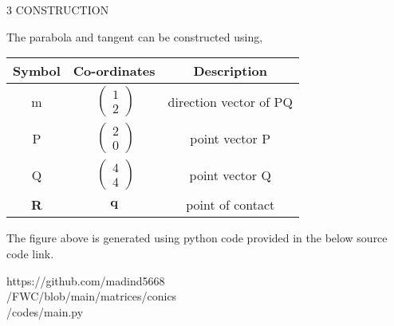\documentclass[a4paper,10pt]{report}
\let\vec\mathbf
\begin{document}
\begin{multicols}{2}
\vspace{2mm}\\
\vspace{2mm}\\
\centering \large\textsc{3  C}\footnotesize\textsc{ONSTRUCTION}\vspace{5mm}\\
\raggedright\large{The parabola and tangent can be constructed using,} 
\begin{center}
    \label{tab:truthtable}
    \setlength{\arrayrulewidth}{0.2mm}
\setlength{\tabcolsep}{5pt}
\renewcommand{\arraystretch}{1.25}
    \begin{tabular}{|c|c|c|}
    \hline %
      \large\textbf{Symbol} & \large\textbf{Co-ordinates} & \large\textbf{Description}\\
      \hline
	\large m & $\ \begin{pmatrix} 1\\2 \end{pmatrix}$ & \large direction vector of PQ\\
       \large P & $\ \begin{pmatrix} 2\\0 \end{pmatrix}$ & \large point vector P\\
	\large Q & $\ \begin{pmatrix} 4\\4 \end{pmatrix}$ & \large point vector Q\\
	\large \textbf{R} & $\vec{q}$ & point of contact\\
      \hline
   \end{tabular}
 \end{center}\vspace{5mm}
\raggedright\large{The figure above is generated using python code provided in the below source code link.}\vspace{2mm}\\
\begin{mdframed}
\raggedright\large{https://github.com/madind5668 \\ /FWC/blob/main/matrices/conics \\ /codes/main.py}
\end{mdframed}
\end{multicols}
\end{document}
